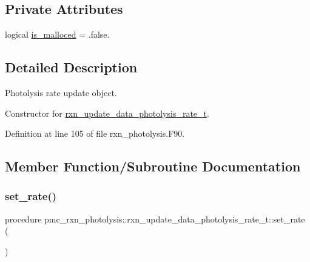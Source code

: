 \subsection*{Private Attributes}
\begin{DoxyCompactItemize}
\item 
logical \mbox{\hyperlink{structpmc__rxn__photolysis_1_1rxn__update__data__photolysis__rate__t_ad88ab98768106bc8b370abcf5dddc6eb}{is\+\_\+malloced}} = .false.
\end{DoxyCompactItemize}


\subsection{Detailed Description}
Photolysis rate update object. 

Constructor for \mbox{\hyperlink{structpmc__rxn__photolysis_1_1rxn__update__data__photolysis__rate__t}{rxn\+\_\+update\+\_\+data\+\_\+photolysis\+\_\+rate\+\_\+t}}. 

Definition at line 105 of file rxn\+\_\+photolysis.\+F90.



\subsection{Member Function/\+Subroutine Documentation}
\mbox{\label{structpmc__rxn__photolysis_1_1rxn__update__data__photolysis__rate__t_ad3fc3753c203b145c225b48b853b02d7}} 
\subsubsection{\texorpdfstring{set\+\_\+rate()}{set\_rate()}}
{\footnotesize\ttfamily procedure pmc\+\_\+rxn\+\_\+photolysis\+::rxn\+\_\+update\+\_\+data\+\_\+photolysis\+\_\+rate\+\_\+t\+::set\+\_\+rate (\begin{DoxyParamCaption}{ }\end{DoxyParamCaption})\hspace{0.3cm}{\ttfamily [private]}}



